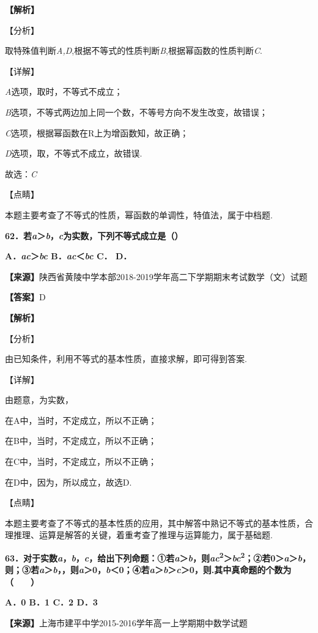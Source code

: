 \documentclass[
]{article}
\begin{document}
\textbf{【解析】}

【分析】

取特殊值判断\emph{A,D},根据不等式的性质判断\emph{B},根据幂函数的性质判断\emph{C}.

【详解】

\emph{A}选项，取时，不等式不成立；

\emph{B}选项，不等式两边加上同一个数，不等号方向不发生改变，故错误；

\emph{C}选项，根据幂函数在R上为增函数知，故正确；

\emph{D}选项，取，不等式不成立，故错误.

故选：\emph{C}

【点睛】

本题主要考查了不等式的性质，幂函数的单调性，特值法，属于中档题.

\textbf{62．若\emph{a}＞\emph{b}，\emph{c}为实数，下列不等式成立是（）}

\textbf{A．\emph{ac}＞\emph{bc} B．\emph{ac}＜\emph{bc} C． D．}

\textbf{【来源】}陕西省黄陵中学本部2018-2019学年高二下学期期末考试数学（文）试题

\textbf{【答案】}D

\textbf{【解析】}

【分析】

由已知条件，利用不等式的基本性质，直接求解，即可得到答案.

【详解】

由题意，为实数，

在A中，当时，不定成立，所以不正确；

在B中，当时，不定成立，所以不正确；

在C中，当时，不定成立，所以不正确；

在D中，因为，所以成立，故选D.

【点睛】

本题主要考查了不等式的基本性质的应用，其中解答中熟记不等式的基本性质，合理推理、运算是解答的关键，着重考查了推理与运算能力，属于基础题.

\textbf{63．对于实数\emph{a}，\emph{b}，\emph{c}，给出下列命题：①若\emph{a}＞\emph{b}，则\emph{ac}\textsuperscript{2}＞\emph{bc}\textsuperscript{2}；②若0＞\emph{a}＞\emph{b}，则；③若\emph{a}＞\emph{b}，，则\emph{a}＞0，\emph{b}＜0；④若\emph{a}＞\emph{b}＞\emph{c}＞0，则.其中真命题的个数为（　　）}

\textbf{A．0 B．1 C．2 D．3}

\textbf{【来源】}上海市建平中学2015-2016学年高一上学期期中数学试题
\end{document}

